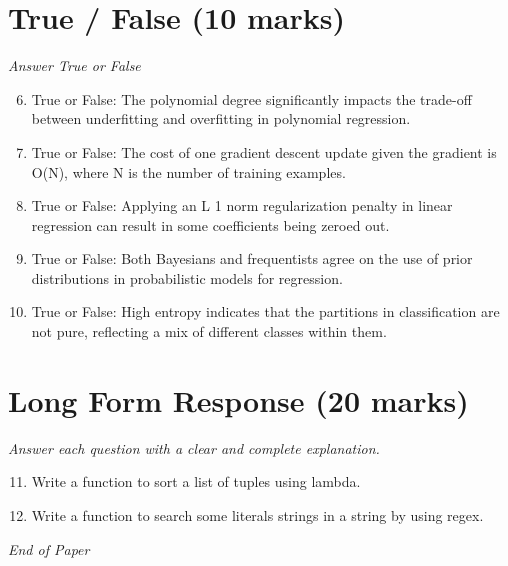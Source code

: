 \documentclass[12pt]{article}
\begin{document}
\section*{True / False (10 marks)}
\textit{Answer True or False}
\begin{enumerate}[label=\arabic*.]
\setcounter{enumi}{5}
\item True or False: The polynomial degree significantly impacts the trade-off between underfitting and overfitting in polynomial regression.
\item True or False: The cost of one gradient descent update given the gradient is O(N), where N is the number of training examples.
\item True or False: Applying an L 1 norm regularization penalty in linear regression can result in some coefficients being zeroed out.
\item True or False: Both Bayesians and frequentists agree on the use of prior distributions in probabilistic models for regression.
\item True or False: High entropy indicates that the partitions in classification are not pure, reflecting a mix of different classes within them.
\end{enumerate}

\section*{Long Form Response (20 marks)}
\textit{Answer each question with a clear and complete explanation.}
\begin{enumerate}[label=\arabic*.]
\setcounter{enumi}{10}
\item Write a function to sort a list of tuples using lambda.
\item Write a function to search some literals strings in a string by using regex.
\end{enumerate}

\vfill
\noindent\textit{End of Paper}
\end{document}
